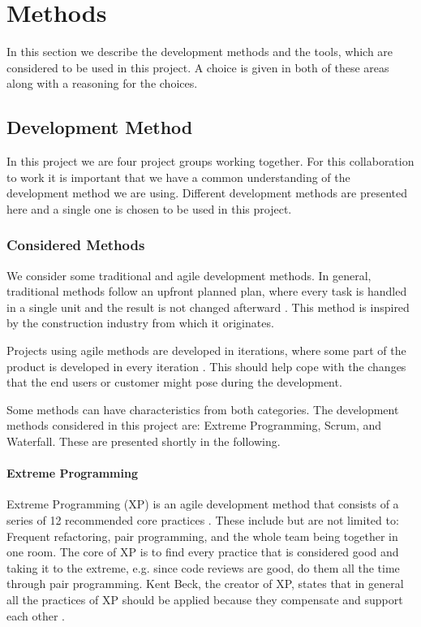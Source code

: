 \chapter{Methods}
In this section we describe the development methods and the tools, which are considered to be used in this project.
A choice is given in both of these areas along with a reasoning for the choices.

\section{Development Method}
In this project we are four project groups working together.
For this collaboration to work it is important that we have a common understanding of the development method we are using.
Different development methods are presented here and a single one is chosen to be used in this project.

\subsection{Considered Methods}
We consider some traditional and agile development methods. 
In general, traditional methods follow an upfront planned plan, where every task is handled in a single unit and the result is not changed afterward \cite[sec.~2.7]{Poppendieck00}.
This method is inspired by the construction industry from which it originates.

Projects using agile methods are developed in iterations, where some part of the product is developed in every iteration \cite[p.~25]{Larman04}.
This should help cope with the changes that the end users or customer might pose during the development.

Some methods can have characteristics from both categories.
The development methods considered in this project are: Extreme Programming, Scrum, and Waterfall.
These are presented shortly in the following.

\subsubsection{Extreme Programming}
Extreme Programming (XP) is an agile development method that consists of a series of 12 recommended core practices \cite[p.~137]{Larman04}.
These include but are not limited to: Frequent refactoring, pair programming, and the whole team being together in one room.
The core of XP is to find every practice that is considered good and taking it to the extreme, e.g. since code reviews are good, do them all the time through pair programming.
Kent Beck, the creator of XP, states that in general all the practices of XP should be applied because they compensate and support each other \cite[p.~156-157]{Larman04}.

